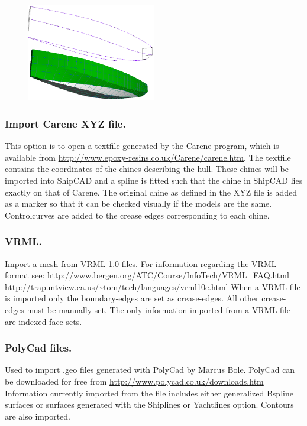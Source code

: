 \documentclass[12pt]{article}
\begin{document}
\begin{figure}
        \centering
        \includegraphics[width=0.5\textwidth,natwidth=654,natheight=501]{filecarene.png}
        \caption{}
        \label{fig:carene}
\end{figure}

\subsubsection{Import Carene XYZ file.}
This option is to open a textfile generated by the Carene program,
which is available from
\url{http://www.epoxy-resins.co.uk/Carene/carene.htm}. The textfile
contains the coordinates of the chines describing the hull. These
chines will be imported into ShipCAD and a spline is fitted such that
the chine in ShipCAD lies exactly on that of Carene. The original
chine as defined in the XYZ file is added as a marker so that it can
be checked visually if the models are the same. Controlcurves are
added to the crease edges corresponding to each chine.

\subsubsection{VRML.}
Import a mesh from VRML 1.0 files. For information regarding the VRML
format see:
\url{http://www.bergen.org/ATC/Course/InfoTech/VRML_FAQ.html}
\url{http://trap.mtview.ca.us/~tom/tech/languages/vrml10c.html}
When a VRML file is imported only the boundary-edges are set as crease-edges. All other crease-
edges must be manually set. The only information imported from a VRML file are indexed face sets.

\subsubsection{PolyCad files.}
Used to import .geo files generated with PolyCad by Marcus
Bole. PolyCad can be downloaded for free
from \url{http://www.polycad.co.uk/downloads.htm} Information
currently imported from the file includes either generalized Bspline
surfaces or surfaces generated with the Shiplines or Yachtlines
option. Contours are also imported.
\end{document}
